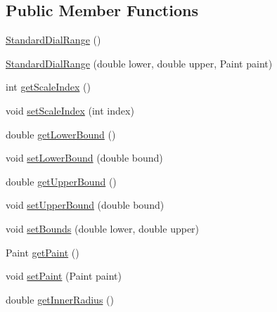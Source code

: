 \subsection*{Public Member Functions}
\begin{DoxyCompactItemize}
\item 
\mbox{\hyperlink{classorg_1_1jfree_1_1chart_1_1plot_1_1dial_1_1_standard_dial_range_ac51c8bc672e1024628be5586fd008ebb}{Standard\+Dial\+Range}} ()
\item 
\mbox{\hyperlink{classorg_1_1jfree_1_1chart_1_1plot_1_1dial_1_1_standard_dial_range_a5fc7b5a3bd67a46261902d10559019c8}{Standard\+Dial\+Range}} (double lower, double upper, Paint paint)
\item 
int \mbox{\hyperlink{classorg_1_1jfree_1_1chart_1_1plot_1_1dial_1_1_standard_dial_range_a019cb98d6dc8e80e906e682683f2bc6c}{get\+Scale\+Index}} ()
\item 
void \mbox{\hyperlink{classorg_1_1jfree_1_1chart_1_1plot_1_1dial_1_1_standard_dial_range_a9ca6b99ad0d461c6dd6ae21cbeae2c9d}{set\+Scale\+Index}} (int index)
\item 
double \mbox{\hyperlink{classorg_1_1jfree_1_1chart_1_1plot_1_1dial_1_1_standard_dial_range_a115710e99c844cfe17be058ab3fedc1d}{get\+Lower\+Bound}} ()
\item 
void \mbox{\hyperlink{classorg_1_1jfree_1_1chart_1_1plot_1_1dial_1_1_standard_dial_range_a0d68b1fc919869ee5330a5904dfca573}{set\+Lower\+Bound}} (double bound)
\item 
double \mbox{\hyperlink{classorg_1_1jfree_1_1chart_1_1plot_1_1dial_1_1_standard_dial_range_a2bd7326ba0d20c64028fd552e90cc27c}{get\+Upper\+Bound}} ()
\item 
void \mbox{\hyperlink{classorg_1_1jfree_1_1chart_1_1plot_1_1dial_1_1_standard_dial_range_a23793be046d52769685411c84117b287}{set\+Upper\+Bound}} (double bound)
\item 
void \mbox{\hyperlink{classorg_1_1jfree_1_1chart_1_1plot_1_1dial_1_1_standard_dial_range_a013aa4749162cfbe2ca1d8319f43a744}{set\+Bounds}} (double lower, double upper)
\item 
Paint \mbox{\hyperlink{classorg_1_1jfree_1_1chart_1_1plot_1_1dial_1_1_standard_dial_range_a74fc216bebcdfc919fb55d24238d090b}{get\+Paint}} ()
\item 
void \mbox{\hyperlink{classorg_1_1jfree_1_1chart_1_1plot_1_1dial_1_1_standard_dial_range_a00c1867bb1933c1aaa11327e2c70e237}{set\+Paint}} (Paint paint)
\item 
double \mbox{\hyperlink{classorg_1_1jfree_1_1chart_1_1plot_1_1dial_1_1_standard_dial_range_a4fb26fca134c0fe84ec30bdd158cd32e}{get\+Inner\+Radius}} ()

\end{DoxyCompactItemize}
